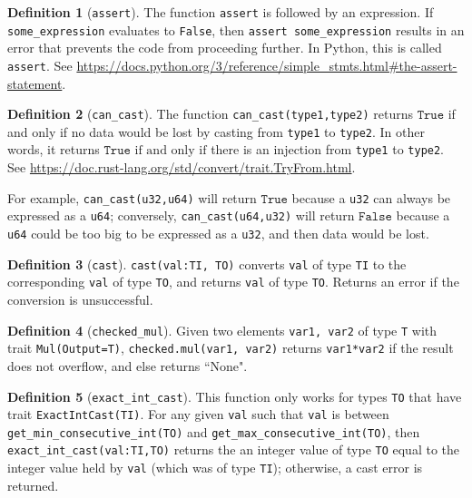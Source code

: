 \documentclass[11pt,a4paper]{article}
\theoremstyle{definition}
\newtheorem{definition}{Definition}[section]
\newcommand{\True}{\texttt{True}}
\newcommand{\False}{\texttt{False}}
\newcommand{\inRust}[2]{See \url{#2}.}
\newcommand{\inPython}[2]{In Python, this is called \texttt{#1}. See \url{#2}.}
\newcommand{\iffText}{\text{if and only if}}
\begin{document}
\begin{definition}[\texttt{assert}] 
    The function \texttt{assert} is followed by an expression. If \texttt{some\_expression} evaluates to \texttt{False}, then \texttt{assert some\_expression} results in an error that prevents the code from proceeding further. \inPython{\texttt{assert}}{https://docs.python.org/3/reference/simple_stmts.html\#the-assert-statement}
\end{definition}

\begin{definition}[\texttt{can\_cast}]
    The function \texttt{can\_cast(type1,type2)} returns $\True$ if and only if no data would be lost by casting from \texttt{type1} to \texttt{type2}. In other words, it returns $\True$ $\iffText$ there is an injection from \texttt{type1} to \texttt{type2}. \inRust{std::convert::TryFrom}{https://doc.rust-lang.org/std/convert/trait.TryFrom.html}
\end{definition}

For example, \texttt{can\_cast(u32,u64)} will return $\True$ because a \texttt{u32} can always be expressed as a \texttt{u64}; conversely, \texttt{can\_cast(u64,u32)} will return $\False$ because a \texttt{u64} could be too big to be expressed as a \texttt{u32}, and then data would be lost.

\begin{definition}[\texttt{cast}]
    \texttt{cast(val:TI, TO)} converts \texttt{val} of type \texttt{TI} to the corresponding \texttt{val} of type \texttt{TO}, and returns \texttt{val} of type \texttt{TO}. Returns an error if the conversion is unsuccessful.
\end{definition}

\begin{definition}[\texttt{checked\_mul}]
     Given two elements \texttt{var1, var2} of type \texttt{T} with trait \texttt{Mul(Output=T)}, \texttt{checked.mul(var1, var2)} returns \texttt{var1*var2} if the result does not overflow, and else returns ``None".
\end{definition}


\begin{definition}[\texttt{exact\_int\_cast}]
    This function only works for types \texttt{TO} that have trait \texttt{ExactIntCast(TI)}. For any given \texttt{val} such that \texttt{val} is between \texttt{get\_min\_consecutive\_int(TO)} and \texttt{get\_max\_consecutive\_int(TO)}, then \texttt{exact\_int\_cast(val:TI,TO)} returns the an integer value of type \texttt{TO} equal to the integer value held by  \texttt{val} (which was of type \texttt{TI}); otherwise, a cast error is returned.
\end{definition}
\end{document}
